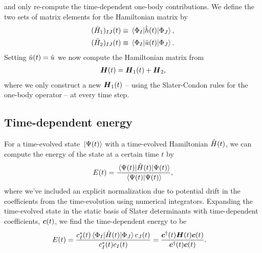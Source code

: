             and only re-compute the time-dependent one-body contributions.
            We define the two sets of matrix elements for the Hamiltonian matrix
            by
            \begin{gather}
                (\hat{H}_1)_{IJ}(t)
                \equiv
                \mel*{\Phi_I}{\hat{h}(t)}{\Phi_J}, \\
                (\hat{H}_2)_{IJ}(t)
                \equiv
                \mel*{\Phi_I}{\hat{u}(t)}{\Phi_J}.
            \end{gather}
            Setting $\hat{u}(t) = \hat{u}$ we now compute the Hamiltonian
            matrix from
            \begin{align}
                \boldsymbol{H}(t)
                = \boldsymbol{H}_1(t) + \boldsymbol{H}_2,
            \end{align}
            where we only construct a new $\boldsymbol{H}_1(t)$ -- using the
            Slater-Condon rules for the one-body operator -- at every time step.

        \subsection{Time-dependent energy}
            For a time-evolved state $\ket*{\Psi(t)}$ with a time-evolved
            Hamiltonian $\hat{H}(t)$, we can compute the energy of the state at a
            certain time $t$ by
            \begin{align}
                E(t) = \frac{
                    \mel*{\Psi(t)}{\hat{H}(t)}{\Psi(t)}
                }{
                    \braket*{\Psi(t)}
                },
            \end{align}
            where we've included an explicit normalization due to potential
            drift in the coefficients from the time-evolution using numerical
            integrators.
            Expanding the time-evolved state in the static basis of Slater
            determinants with time-dependent coefficients, $\boldsymbol{c}(t)$, we find
            the time-dependent energy to be
            \begin{align}
                E(t)
                &=
                \frac{
                    c^{*}_I(t)\mel*{\Phi_I}{\hat{H}(t)}{\Phi_J}c_J(t)
                }{
                    c^{*}_I(t)c_I(t)
                }
                = \frac{
                    \boldsymbol{c}^{\dagger}(t)\boldsymbol{H}(t)\boldsymbol{c}(t)
                }{
                    \boldsymbol{c}^{\dagger}(t)\boldsymbol{c}(t)
                }.
            \end{align}


